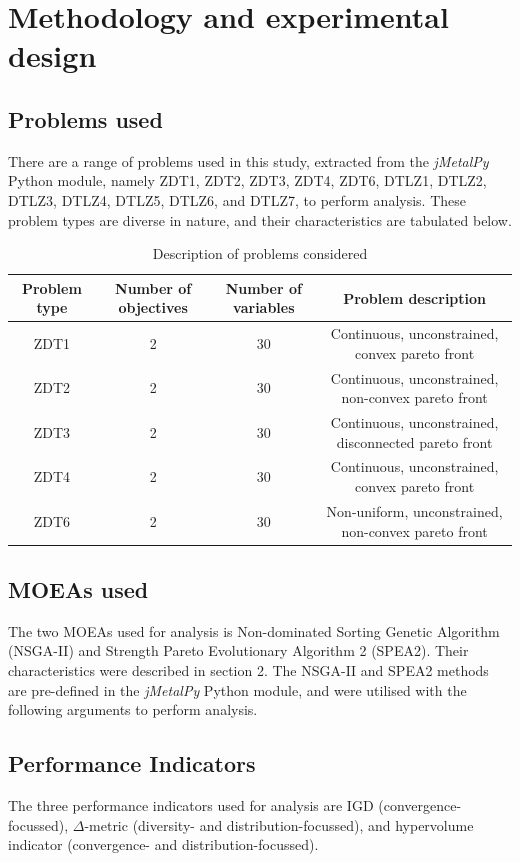 \documentclass[sigconf,nonacm]{acmart}
\begin{document}
\section{Methodology and experimental design}
\subsection{Problems used}
There are a range of problems used in this study, extracted from the \textit{jMetalPy} Python module, namely ZDT1, ZDT2, ZDT3, ZDT4, ZDT6, DTLZ1, DTLZ2, DTLZ3, DTLZ4, DTLZ5, DTLZ6, and DTLZ7, to perform analysis. These problem types are diverse in nature, and their characteristics are tabulated below.\\
\begin{table}[t]
\centering
\begin{tabular}{|c|c|c|c|}
\hline
Problem type & Number of objectives & Number of variables & Problem description \\
\hline
ZDT1 & 2 & 30 & Continuous, unconstrained, convex pareto front \\
ZDT2 & 2 & 30 & Continuous, unconstrained, non-convex pareto front \\
ZDT3 & 2 & 30 & Continuous, unconstrained, disconnected pareto front \\
ZDT4 & 2 & 30 & Continuous, unconstrained, convex pareto front \\
ZDT6 & 2 & 30 & Non-uniform, unconstrained, non-convex pareto front \\
\hline
\end{tabular}
\caption{Description of problems considered}
\end{table}
\subsection{MOEAs used}
The two MOEAs used for analysis is Non-dominated Sorting Genetic Algorithm (NSGA-II) and Strength Pareto Evolutionary Algorithm 2 (SPEA2). Their characteristics were described in section 2. The NSGA-II and SPEA2 methods are pre-defined in the \textit{jMetalPy} Python module, and were utilised with the following arguments to perform analysis.
\subsection{Performance Indicators}
The three performance indicators used for analysis are IGD (convergence-focussed), $\Delta$-metric (diversity- and distribution-focussed), and hypervolume indicator (convergence- and distribution-focussed).
\end{document}
